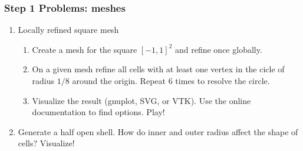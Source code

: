 \begin{frame}
  \frametitle{Step 1 Problems: meshes}
  \begin{enumerate}
    \item Locally refined square mesh
    \begin{enumerate}
    \item Create a mesh for the square $[-1,1]^2$ and refine once globally.
    \item On a given mesh refine all cells with at least one vertex in
      the cicle of radius $1/8$ around the origin. Repeat 6 times to
      resolve the circle.
    \item Visualize the result (gnuplot, SVG, or VTK). Use the online
      documentation to find options. Play!
    \end{enumerate}
  \item Generate a half open shell. How do inner and outer radius
    affect the shape of cells? Visualize!
  \end{enumerate}
\end{frame}
